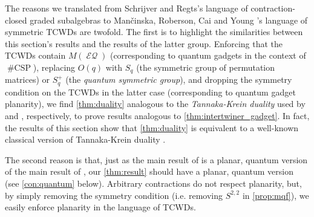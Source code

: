 \documentclass{theoretics}
\DeclareMathOperator{\csp}{\#CSP}
\DeclareMathOperator{\eq}{\mathcal{EQ}}
\begin{document}
\begin{remark}
    \label{rem:duality}
    The reasons we translated from 
    Schrijver and Regts's \cite{schrijver_tensor_2008, regts_rank_2012} language of
    contraction-closed graded subalgebras to
    Man\v{c}inska, Roberson, Cai and Young
    \cite{planar, cai_planar_2023, young2022equality}'s language of symmetric TCWDs are twofold. 
    The first is to highlight the similarities
    between this section's results and the results of the latter group. 
    Enforcing that
    the TCWDs contain $M(\eq)$ (corresponding to quantum gadgets in the context of $\csp$), 
    replacing $O(q)$ with $S_q$ (the symmetric group of permutation matrices) or $S^+_q$ 
    (the \emph{quantum symmetric group}), 
    and dropping the symmetry condition on the TCWDs 
    in the latter case (corresponding to quantum gadget planarity), we find 
    \autoref{thm:duality} analogous to the
    \emph{Tannaka-Krein duality} used by \cite{young2022equality} and 
    \cite{planar, cai_planar_2023}, respectively, to prove results analogous to 
    \autoref{thm:intertwiner_gadget}. In fact, the results of this section show that
    \autoref{thm:duality} is equivalent to a well-known classical version of Tannaka-Krein
    duality \cite[Theorem 1.3]{banica_liberation_2009}.

    The second reason is that, just as the main result of \cite{cai_planar_2023} is a planar, quantum
    version
    of the main result of \cite{young2022equality}, our \autoref{thm:result} should have a planar, 
    quantum
    version (see \autoref{con:quantum} below). Arbitrary contractions do not respect planarity, but,
    by simply removing the symmetry condition (i.e. removing $S^{2,2}$ in \autoref{prop:mqf}), 
    we easily enforce planarity in the language of TCWDs.
\end{remark}
\end{document}
